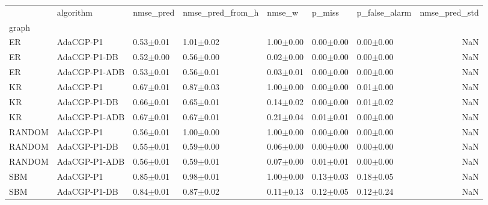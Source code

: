 \begin{tabular}{lllllllr}
\toprule
 & algorithm & nmse_pred & nmse_pred_from_h & nmse_w & p_miss & p_false_alarm & nmse_pred_std \\
graph &  &  &  &  &  &  &  \\
\midrule
ER & AdaCGP-P1 & 0.53{\scriptsize$\pm$0.01} & 1.01{\scriptsize$\pm$0.02} & 1.00{\scriptsize$\pm$0.00} & 0.00{\scriptsize$\pm$0.00} & 0.00{\scriptsize$\pm$0.00} & NaN \\
ER & AdaCGP-P1-DB & 0.52{\scriptsize$\pm$0.00} & 0.56{\scriptsize$\pm$0.00} & 0.02{\scriptsize$\pm$0.00} & 0.00{\scriptsize$\pm$0.00} & 0.00{\scriptsize$\pm$0.00} & NaN \\
ER & AdaCGP-P1-ADB & 0.53{\scriptsize$\pm$0.01} & 0.56{\scriptsize$\pm$0.01} & 0.03{\scriptsize$\pm$0.01} & 0.00{\scriptsize$\pm$0.00} & 0.00{\scriptsize$\pm$0.00} & NaN \\
KR & AdaCGP-P1 & 0.67{\scriptsize$\pm$0.01} & 0.87{\scriptsize$\pm$0.03} & 1.00{\scriptsize$\pm$0.00} & 0.00{\scriptsize$\pm$0.00} & 0.01{\scriptsize$\pm$0.00} & NaN \\
KR & AdaCGP-P1-DB & 0.66{\scriptsize$\pm$0.01} & 0.65{\scriptsize$\pm$0.01} & 0.14{\scriptsize$\pm$0.02} & 0.00{\scriptsize$\pm$0.00} & 0.01{\scriptsize$\pm$0.02} & NaN \\
KR & AdaCGP-P1-ADB & 0.67{\scriptsize$\pm$0.01} & 0.67{\scriptsize$\pm$0.01} & 0.21{\scriptsize$\pm$0.04} & 0.01{\scriptsize$\pm$0.01} & 0.00{\scriptsize$\pm$0.00} & NaN \\
RANDOM & AdaCGP-P1 & 0.56{\scriptsize$\pm$0.01} & 1.00{\scriptsize$\pm$0.00} & 1.00{\scriptsize$\pm$0.00} & 0.00{\scriptsize$\pm$0.00} & 0.00{\scriptsize$\pm$0.00} & NaN \\
RANDOM & AdaCGP-P1-DB & 0.55{\scriptsize$\pm$0.01} & 0.59{\scriptsize$\pm$0.00} & 0.06{\scriptsize$\pm$0.00} & 0.00{\scriptsize$\pm$0.00} & 0.00{\scriptsize$\pm$0.00} & NaN \\
RANDOM & AdaCGP-P1-ADB & 0.56{\scriptsize$\pm$0.01} & 0.59{\scriptsize$\pm$0.01} & 0.07{\scriptsize$\pm$0.00} & 0.01{\scriptsize$\pm$0.01} & 0.00{\scriptsize$\pm$0.00} & NaN \\
SBM & AdaCGP-P1 & 0.85{\scriptsize$\pm$0.01} & 0.98{\scriptsize$\pm$0.01} & 1.00{\scriptsize$\pm$0.00} & 0.13{\scriptsize$\pm$0.03} & 0.18{\scriptsize$\pm$0.05} & NaN \\
SBM & AdaCGP-P1-DB & 0.84{\scriptsize$\pm$0.01} & 0.87{\scriptsize$\pm$0.02} & 0.11{\scriptsize$\pm$0.13} & 0.12{\scriptsize$\pm$0.05} & 0.12{\scriptsize$\pm$0.24} & NaN \\

\end{tabular}
